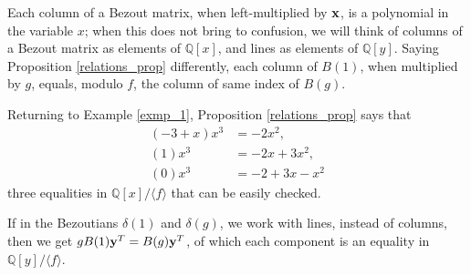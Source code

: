 \documentclass{standalone}
\begin{document}
\begin{rem}
Each column of a Bezout matrix, when left-multiplied by $\bold{x}$, is a polynomial in the variable $x$; when this does not bring to confusion, we will think of columns of a Bezout matrix as elements of $\mathbb{Q}[x]$, and lines as elements of $\mathbb{Q}[y]$.
Saying Proposition \ref{relations_prop} differently, each column of $B(1)$, when multiplied by $g$, equals, modulo $f$, the column of same index of $B(g)$.
\end{rem}

\begin{exmp}
Returning to Example \ref{exmp_1}, Proposition \ref{relations_prop} says that
\begin{align*}
 (-3 + x)x^3 &= -2x^2, \\
 (1)x^3 &= -2x + 3x^2, \\
 (0)x^3 &= -2 + 3x - x^2
\end{align*}
three equalities in $\mathbb{Q}[x]/\langle f \rangle$ that can be easily checked.
\end{exmp}

\begin{rem}
If in the Bezoutians $\delta(1)$ and $\delta(g)$, we work with lines, instead of columns, then we get $gB(1)\bold{y}^T = B(g)\bold{y}^T$, of which each component is an equality in $\mathbb{Q}[y]/\langle f \rangle$.
\end{rem}
\end{document}
